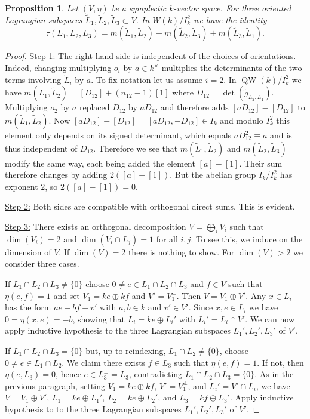 \documentclass{article}
\def\ul#1{\underline{#1}}
\newtheorem{pro}[thm]{Proposition}
\theoremstyle{definition}
\numberwithin{equation}{subsection}
\renewcommand{\-}{\hyp{}}
\DeclareMathOperator{\QW}{QW}
\begin{document}
\begin{appendices}
\begin{pro} \label{pro:maslov_break}
	Let $(V,\eta)$ be a symplectic $k$-vector space. For three oriented Lagrangian subspaces $\tilde L_1,\tilde L_2,\tilde L_3 \subset V$. In $W(k)/I_k^2$ we have the identity
	\[ \tau(L_1,L_2,L_3) = m(\tilde L_1,\tilde L_2) + m(\tilde L_2,\tilde L_3) + m(\tilde L_3,\tilde L_1). \] 
\end{pro}
\begin{proof}
	\ul{Step 1:} The right hand side is independent of the choices of orientations. Indeed, changing multiplying $o_i$ by $a \in k^\times$ multiplies the determinants of the two terms involving $\tilde L_i$ by $a$. To fix notation let us assume $i=2$. In $\QW(k)/I_k^2$ we have $m(\tilde L_1,\tilde L_2)=[D_{12}]+(n_{12}-1)[1]$ where $D_{12}=\det(\tilde g_{L_2,L_1})$. Multiplying $o_2$ by $a$ replaced $D_{12}$ by $aD_{12}$ and therefore adds $[aD_{12}]-[D_{12}]$ to $m(\tilde L_1,\tilde L_2)$. Now $[aD_{12}]-[D_{12}] = [aD_{12},-D_{12}] \in I_k$ and modulo $I_k^2$ this element only depends on its signed determinant, which equals $aD_{12}^2 \equiv a$ and is thus independent of $D_{12}$. Therefore we see that $m(\tilde L_1,\tilde L_2)$ and $m(\tilde L_2,\tilde L_3)$ modify the same way, each being added the element $[a]-[1]$. Their sum therefore changes by adding $2([a]-[1])$. But the abelian group $I_k/I_k^2$ has exponent $2$, so $2([a]-[1])=0$.

	\ul{Step 2:} Both sides are compatible with orthogonal direct sums. This is evident.

	\ul{Step 3:} There exists an orthogonal decomposition $V=\bigoplus_i V_i$ such that $\dim(V_i)=2$ and $\dim(V_i \cap L_j)=1$ for all $i,j$. To see this, we induce on the dimension of $V$. If $\dim(V)=2$ there is nothing to show. For $\dim(V)>2$ we consider three cases. 
	
	If $L_1 \cap L_2 \cap L_3 \neq \{0\}$ choose $0 \neq e \in L_1 \cap L_2 \cap L_3$ and $f \in V$ such that $\eta(e,f) = 1$ and set $V_1=ke \oplus kf$ and $V'=V_1^\perp$. Then $V=V_1 \oplus V'$. Any $x \in L_i$ has the form $ae+bf+v'$ with $a,b \in k$ and $v' \in V'$. Since $x,e \in L_i$ we have $0=\eta(x,e)=-b$, showing that $L_i=ke \oplus L_i'$ with $L_i' = L_i \cap V'$. We can now apply inductive hypothesis to the three Lagrangian subspaces $L_1',L_2',L_3'$ of $V'$.

	If $L_1 \cap L_2 \cap L_3 = \{0\}$ but, up to reindexing, $L_1 \cap L_2 \neq \{0\}$, choose $0 \neq e \in L_1 \cap L_2$. We claim there exists $f \in L_3$ such that $\eta(e,f) = 1$. If not, then $\eta(e,L_3)=0$, hence $e \in L_3^\perp = L_3$, contradicting $L_1 \cap L_2 \cap L_3=\{0\}$. As in the previous paragraph, setting $V_1=ke \oplus kf$, $V'=V_1^\perp$, and $L_i' = V' \cap L_i$, we have $V=V_1 \oplus V'$, $L_1=ke \oplus L_1'$, $L_2=ke \oplus L_2'$, and $L_3=kf \oplus L_3'$. Apply inductive hypothesis to to the three Lagrangian subspaces $L_1',L_2',L_3'$ of $V'$.


\end{proof}
\end{appendices}
\end{document}
